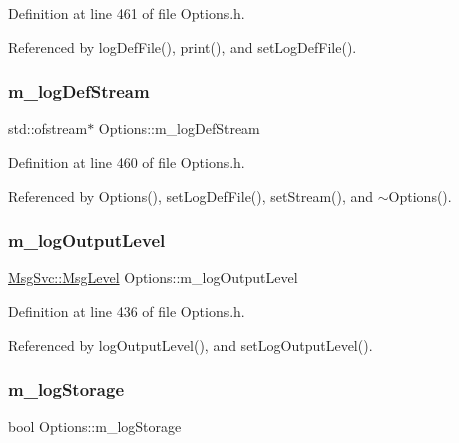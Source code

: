 Definition at line 461 of file Options.\+h.



Referenced by log\+Def\+File(), print(), and set\+Log\+Def\+File().

\mbox{\label{classOptions_aebb2db3fb07ea1f73b27bde841be69d8}} 
\subsubsection{\texorpdfstring{m\+\_\+log\+Def\+Stream}{m\_logDefStream}}
{\footnotesize\ttfamily std\+::ofstream$\ast$ Options\+::m\+\_\+log\+Def\+Stream\hspace{0.3cm}{\ttfamily [private]}}



Definition at line 460 of file Options.\+h.



Referenced by Options(), set\+Log\+Def\+File(), set\+Stream(), and $\sim$\+Options().

\mbox{\label{classOptions_a9ecfefe6bf44ff519369f38eb5c8147a}} 
\subsubsection{\texorpdfstring{m\+\_\+log\+Output\+Level}{m\_logOutputLevel}}
{\footnotesize\ttfamily \hyperlink{classMsgSvc_ae671eb7301996cd049d2da8a65925926}{Msg\+Svc\+::\+Msg\+Level} Options\+::m\+\_\+log\+Output\+Level\hspace{0.3cm}{\ttfamily [private]}}



Definition at line 436 of file Options.\+h.



Referenced by log\+Output\+Level(), and set\+Log\+Output\+Level().

\mbox{\label{classOptions_ab7ffad5110df714233470725ef98be6e}} 
\subsubsection{\texorpdfstring{m\+\_\+log\+Storage}{m\_logStorage}}
{\footnotesize\ttfamily bool Options\+::m\+\_\+log\+Storage\hspace{0.3cm}{\ttfamily [private]}}



